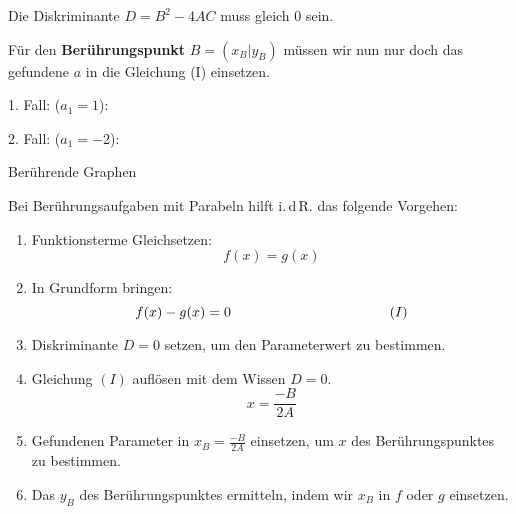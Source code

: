 Die Diskriminante $D=B^2 - 4AC$ muss gleich 0 sein. 

\newpage

Für den \textbf{Berührungspunkt} $B=(x_B|y_B)$ müssen wir nun nur doch das gefundene
$a$ in die Gleichung (I) einsetzen.





1. Fall: ($a_1=1$):




2. Fall: ($a_1=-2$):


\newpage




\begin{rezept}{Berührende Graphen}{}

  Bei Berührungsaufgaben mit Parabeln hilft i.\,d\,R. das folgende
  Vorgehen:

  \begin{enumerate}
  \item Funktionsterme Gleichsetzen: $$f(x) = g(x)$$
  \item In Grundform bringen: $$f(x) - g(x) = 0  \hspace{40mm}
    (I)$$
  \item Diskriminante $D = 0 $ setzen, um den Parameterwert zu
    bestimmen.
  \item Gleichung $(I)$ auflösen mit dem Wissen $D=0$.
    $$x = \frac{-B}{2A}$$

  \item Gefundenen Parameter in $x_B=\frac{-B}{2A}$ einsetzen, um $x$
    des Berührungspunktes zu bestimmen.
  \item Das $y_B$ des Berührungspunktes ermitteln, indem wir $x_B$ in
    $f$ oder $g$ einsetzen.
    \end{enumerate}
\end{rezept}



